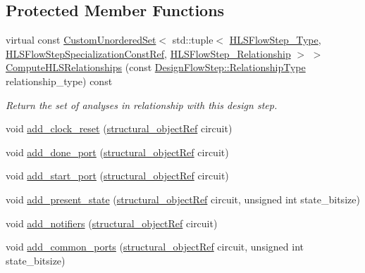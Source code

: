 \subsection*{Protected Member Functions}
\begin{DoxyCompactItemize}
\item 
virtual const \hyperlink{classCustomUnorderedSet}{Custom\+Unordered\+Set}$<$ std\+::tuple$<$ \hyperlink{hls__step_8hpp_ada16bc22905016180e26fc7e39537f8d}{H\+L\+S\+Flow\+Step\+\_\+\+Type}, \hyperlink{hls__step_8hpp_a5fdd2edf290c196531d21d68e13f0e74}{H\+L\+S\+Flow\+Step\+Specialization\+Const\+Ref}, \hyperlink{hls__step_8hpp_a3ad360b9b11e6bf0683d5562a0ceb169}{H\+L\+S\+Flow\+Step\+\_\+\+Relationship} $>$ $>$ \hyperlink{classControlFlowChecker_ac192ee094e00ea4866d13a6b057da879}{Compute\+H\+L\+S\+Relationships} (const \hyperlink{classDesignFlowStep_a723a3baf19ff2ceb77bc13e099d0b1b7}{Design\+Flow\+Step\+::\+Relationship\+Type} relationship\+\_\+type) const
\begin{DoxyCompactList}\small\item\em Return the set of analyses in relationship with this design step. \end{DoxyCompactList}\item 
void \hyperlink{classControlFlowChecker_a0871b9dfdf0f1875f8e61da585bdc2f3}{add\+\_\+clock\+\_\+reset} (\hyperlink{structural__objects_8hpp_a8ea5f8cc50ab8f4c31e2751074ff60b2}{structural\+\_\+object\+Ref} circuit)
\item 
void \hyperlink{classControlFlowChecker_ac4b9c980db09ade524a0e72cd6d833d1}{add\+\_\+done\+\_\+port} (\hyperlink{structural__objects_8hpp_a8ea5f8cc50ab8f4c31e2751074ff60b2}{structural\+\_\+object\+Ref} circuit)
\item 
void \hyperlink{classControlFlowChecker_a8f2801e5c890005e2a9dcf43bd9c03de}{add\+\_\+start\+\_\+port} (\hyperlink{structural__objects_8hpp_a8ea5f8cc50ab8f4c31e2751074ff60b2}{structural\+\_\+object\+Ref} circuit)
\item 
void \hyperlink{classControlFlowChecker_ac5e7bcac34c385399655961eebc4ee59}{add\+\_\+present\+\_\+state} (\hyperlink{structural__objects_8hpp_a8ea5f8cc50ab8f4c31e2751074ff60b2}{structural\+\_\+object\+Ref} circuit, unsigned int state\+\_\+bitsize)
\item 
void \hyperlink{classControlFlowChecker_a99cb7891e87b906171c4330e53a96da7}{add\+\_\+notifiers} (\hyperlink{structural__objects_8hpp_a8ea5f8cc50ab8f4c31e2751074ff60b2}{structural\+\_\+object\+Ref} circuit)
\item 
void \hyperlink{classControlFlowChecker_ab2feb53a8bf9a796c2d693083fd16944}{add\+\_\+common\+\_\+ports} (\hyperlink{structural__objects_8hpp_a8ea5f8cc50ab8f4c31e2751074ff60b2}{structural\+\_\+object\+Ref} circuit, unsigned int state\+\_\+bitsize)
\end{DoxyCompactItemize}
